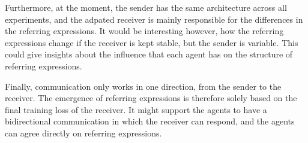 Furthermore, at the moment, the sender has the same architecture across all experiments, and the adpated receiver is mainly responsible for the differences in the referring expressions.
It would be interesting however, how the referring expressions change if the receiver is kept stable, but the sender is variable.
This could give insights about the influence that each agent has on the structure of referring expressions.

Finally, communication only works in one direction, from the sender to the receiver.
The emergence of referring expressions is therefore solely based on the final training loss of the receiver.
It might support the agents to have a bidirectional communication in which the receiver can respond, and the agents can agree directly on referring expressions.